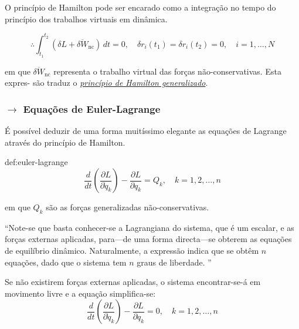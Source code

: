 \renewcommand*{\thefootnote}{\arabic{footnote}}

\noindent O princípio de Hamilton pode ser encarado como a integração no tempo do princípio dos trabalhos virtuais em dinâmica.

\begin{mdframed}
$$
    \therefore \int_{t_1}^{t_2} (\delta L + \overline{\delta W}_{\text{nc}}) \, dt = 0,\quad \delta r_i (t_1) = \delta r_i (t_2) = 0,\quad i = 1,\dots,N  
$$
\end{mdframed}
em que $\overline{\delta W}_{\text{nc}}$ representa o trabalho virtual das forças não-conservativas. Esta expres- são traduz o \underline{\textit{princípio de Hamilton generalizado}}\cite{Maia2000}.

\subsubsection[3.2.2 Equações de Euler-Lagrange]{$\rightarrow$ Equações de Euler-Lagrange}

É possível deduzir de uma forma muitíssimo elegante as equações de Lagrange através do princípio de Hamilton.

\begin{theo}{def:euler-lagrange}\label{def:euler-lagrange}
$$
    \frac{d}{dt}\left( \frac{\partial L}{\partial \dot{q}_k} \right) - \frac{\partial L}{\partial q_k} = Q_k,\quad k = 1,2,\dots,n
$$

\noindent em que $Q_k$ são as forças generalizadas não-conservativas.
\end{theo}

 \noindent ``Note-se que basta conhecer-se a Lagrangiana do sistema, que é um escalar, e as forças externas aplicadas, para---de uma forma directa---se obterem as equações de equilíbrio dinâmico. Naturalmente, a expressão indica que se obtêm $n$ equações, dado que o sistema tem $n$ graus de liberdade. ''\cite{Maia2000}

Se não existirem forças externas aplicadas, o sistema encontrar-se-á em movimento livre e a equação simplifica-se:
$$
    \frac{d}{dt}\left( \frac{\partial L}{\partial \dot{q}_k} \right) - \frac{\partial L}{\partial q_k} = 0,\quad k = 1,2,\dots,n
$$


